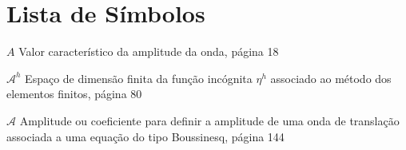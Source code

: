 \chapter*{Lista de S\'{i}mbolos}
\begin{list}{}{
    \setlength{\leftmargin}{1.7cm}
    \setlength{\labelwidth}{1cm}
    \setlength{\itemsep}{4pt}
    \setlength{\labelsep}{0.5cm}}

\item [{$A$}\hspace*{\fill}]\begingroup Valor característico da
  amplitude da onda, página {18}\endgroup

\item [$\mathcal{A}^h$\hspace*{\fill}]\begingroup Espaço de dimensão
  finita da função incógnita $\eta^h$ associado ao método dos
  elementos finitos, página 80\endgroup

\item [$\mathcal{A}$\hspace*{\fill}]\begingroup
  Amplitude ou coeficiente  para definir a amplitude de uma onda de translação
  associada a uma equação do tipo Boussinesq, página
  144\endgroup



\end{list}
